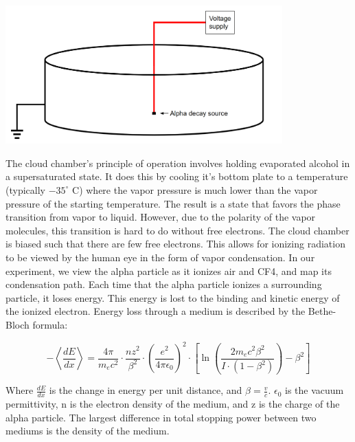 \documentclass[letterpaper,12pt]{article}
\begin{document}
\begin{center}
    \includegraphics[width=0.8\textwidth]{figures/cloud_chamber.png}
    \label{fig:cloud}
\end{center}


The cloud chamber's principle of operation involves holding evaporated alcohol in a supersaturated state. It does this by cooling it's bottom plate to a temperature (typically $-35^\circ$ C) where the vapor pressure is much lower than the vapor pressure of the starting temperature. The result is a state that favors the phase transition from vapor to liquid. However, due to the polarity of the vapor molecules, this transition is hard to do without free electrons. The cloud chamber is biased such that there are few free electrons. This allows for ionizing radiation to be viewed by the human eye in the form of vapor condensation. In our experiment, we view the alpha particle as it ionizes air and CF4, and map its condensation path.
Each time that the alpha particle ionizes a
surrounding particle, it loses energy. This energy is lost to the binding and kinetic energy of the ionized electron. Energy loss through a medium is described by the Bethe-Bloch formula:

\begin{equation}
    -\left<\frac{dE}{dx}\right> = \frac{4\pi}{m_ec^2}\cdot\frac{nz^2}{\beta^2}\cdot\left(\frac{e^2}{4\pi\epsilon_0}\right)^2\cdot\left[\ln\left(\frac{2m_ec^2\beta^2}{I\cdot(1-\beta^2)}\right)-\beta^2\right]
    \label{mattermotion}
\end{equation}

Where $\frac{dE}{dx}$ is the change in energy per unit distance, and $\beta = \frac{v}{c}$. $\epsilon_0$ is the vacuum permittivity, n is the electron density of the medium, and z is the charge of the alpha particle. The largest difference in total stopping power between two mediums is the density of the medium.
\end{document}
